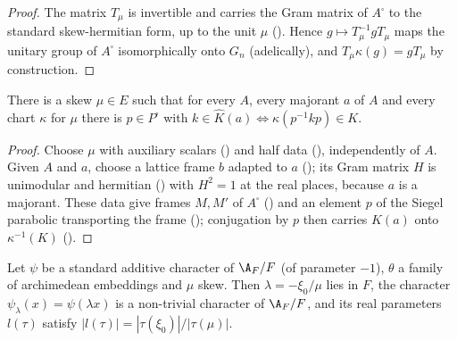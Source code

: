 \begin{proof}
The matrix $T_\mu$ is invertible and carries the Gram matrix of $A^\square$ to the standard skew-hermitian form, up to the unit
$\mu$ (). Hence $g\mapsto T_\mu^{-1}gT_\mu$ maps the unitary group of $A^\square$ isomorphically
onto $G_n$ (adelically), and $T_\mu\kappa(g)=gT_\mu$ by construction.
\end{proof}

\begin{lemma}\label{pf:stageU:conjcompact}
There is a skew $\mu\in E$ such that for every $A$, every majorant $a$ of $A$ and every chart $\kappa$ for $\mu$ there is
$p\in P^\square$ with $k\in\hat K(a)\iff\kappa(p^{-1}kp)\in K$.
\end{lemma}

\begin{proof}
Choose $\mu$ with auxiliary scalars () and half data
(), independently of $A$. Given $A$ and $a$, choose a lattice frame $b$ adapted to $a$
(); its Gram matrix $H$ is unimodular and hermitian
() with $H^2=1$ at the real places, because $a$ is a majorant. These data give
frames $M,M'$ of $A^\square$ () and an element $p$ of the Siegel parabolic transporting
the frame (); conjugation by $p$ then carries $\hat K(a)$ onto
$\kappa^{-1}(K)$ ().
\end{proof}

\begin{lemma}\label{pf:stageU:shiftchar}
Let $\psi$ be a standard additive character of $\A_F/F$ (of parameter $-1$), $\theta$ a family of archimedean embeddings and $\mu$
skew. Then $\lambda=-\xi_0/\mu$ lies in $F$, the character $\psi_\lambda(x)=\psi(\lambda x)$ is a non-trivial character of $\A_F/F$, and
its real parameters $l(\tau)$ satisfy $|l(\tau)|=|\tau(\xi_0)|/|\tau(\mu)|$.
\end{lemma}

